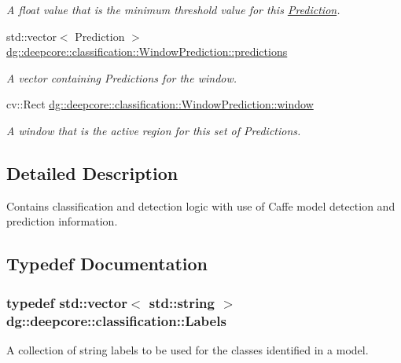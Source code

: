 \begin{DoxyCompactItemize}
\begin{DoxyCompactList}\small\item\em A float value that is the minimum threshold value for this \hyperlink{structdg_1_1deepcore_1_1classification_1_1_prediction}{Prediction}. \end{DoxyCompactList}\item 
std\+::vector$<$ Prediction $>$ \hyperlink{group___classification_module_gaaec179dc0e22d9c897260b650c2a6b82}{dg\+::deepcore\+::classification\+::\+Window\+Prediction\+::predictions}
\begin{DoxyCompactList}\small\item\em A vector containing Predictions for the window. \end{DoxyCompactList}\item 
cv\+::\+Rect \hyperlink{group___classification_module_ga200902328358f2246a5e62d390e57278}{dg\+::deepcore\+::classification\+::\+Window\+Prediction\+::window}
\begin{DoxyCompactList}\small\item\em A window that is the active region for this set of Predictions. \end{DoxyCompactList}\end{DoxyCompactItemize}


\subsection{Detailed Description}
Contains classification and detection logic with use of Caffe model detection and prediction information. 



\subsection{Typedef Documentation}
\subsubsection[{\texorpdfstring{Labels}{Labels}}]{\setlength{\rightskip}{0pt plus 5cm}typedef std\+::vector$<$ std\+::string $>$ {\bf dg\+::deepcore\+::classification\+::\+Labels}}\hypertarget{group___classification_module_ga4c4d47162fed299b627f2e9d17381866}{}\label{group___classification_module_ga4c4d47162fed299b627f2e9d17381866}


A collection of string labels to be used for the classes identified in a model. 

